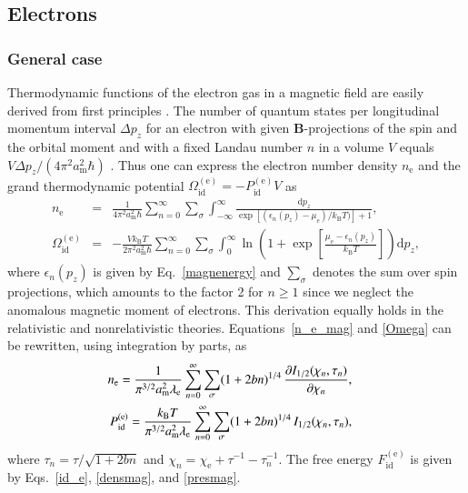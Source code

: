 \documentclass[traditabstract]{aa}
\newcommand{\bea}{\begin{eqnarray}}
\newcommand{\eea}{\end{eqnarray}}
\newcommand{\req}[1]{Eq.~\ref{#1}}
\newcommand{\am}{a_\mathrm{m}}
\newcommand{\chie}{\chi_\mathrm{e}}
\newcommand{\dd}{\mathrm{d}} %
\newcommand{\lambde}{\lambda_\mathrm{e}}
\newcommand{\nel}{n_\mathrm{e}}
\newcommand{\mue}{\mu_\mathrm{e}}
\newcommand{\kB}{k_\mathrm{B}}
\begin{document}
\subsection{Electrons}
\label{sect:mag-e}

\subsubsection{General case}

Thermodynamic functions of the electron gas in a magnetic
field are easily derived from first principles
\citep{LaLi-SP1}. The number of quantum states per
longitudinal momentum interval $\Delta p_z$ for an electron
with given $\bm{B}$-projections of the spin and the orbital
moment and with a fixed Landau number $n$ in a volume $V$
equals $V\Delta p_z/(4\pi^2 a_\mathrm{m}^2 \hbar)$
\citep{LaLi-QM}. Thus one can express the electron number
density $\nel$ and the grand thermodynamic potential
$\Omega_\mathrm{id}^{(\mathrm{e})} = -P_\mathrm{id}^{(\mathrm{e})}V$ as
\bea
   \nel &=& \frac{1}{ 4\pi^2 a_\mathrm{m}^2 \hbar}
   \sum_{n=0}^{\infty} \sum_\sigma \int_{-\infty}^\infty
   \frac{\dd p_z}{\exp[(\epsilon_n(p_z)-\mue)/\kB T)]+1},
\label{n_e_mag}
\\
   \Omega_\mathrm{id}^{(\mathrm{e})} &=&
     -\frac{V \kB T}{2\pi^2 a_\mathrm{m}^2 \hbar}
         \sum_{n=0}^{\infty} \sum_\sigma
           \int_0^\infty \!\!\!
   \ln\left( 1+\exp\left[\frac{\mue-\epsilon_n(p_z)}{\kB T}\right]\right)
          \dd p_z,
\label{Omega}
\eea
where $\epsilon_n(p_z)$ is given by \req{magnenergy} and
$\sum_\sigma$ denotes the sum over spin projections, which
amounts to the factor 2 for $n\geq1$ since we neglect the
anomalous magnetic moment of electrons. This derivation
equally holds in the relativistic and nonrelativistic
theories. Equations~\ref{n_e_mag} and \ref{Omega} can be
rewritten, using integration by parts, as
\bea
   \nel = 
  \frac{1}{\pi^{3/2}\am^2\lambde}
   \sum_{n=0}^{\infty} \sum_\sigma
    (1+2bn)^{1/4}\,
     \frac{\partial I_{1/2}(\chi_n,\tau_n)}{\partial \chi_n},
\hspace*{1em}
\label{densmag}
\\
    P_\mathrm{id}^\mathrm{(e)} =
  \frac{\kB T}{\pi^{3/2}\am^2\lambde}
   \sum_{n=0}^{\infty} \sum_\sigma
    (1+2bn)^{1/4}\, I_{1/2}(\chi_n,\tau_n),
\hspace*{1em}
\label{presmag}
\eea
where
$\tau_n=\tau/\sqrt{1+2bn}
$
and
$
   \chi_n=\chie+\tau^{-1}-\tau_n^{-1}.
$
The free energy $F_\mathrm{id}^\mathrm{(e)}$ is given by
Eqs.~\ref{id_e}, \ref{densmag}, and \ref{presmag}.
\end{document}
